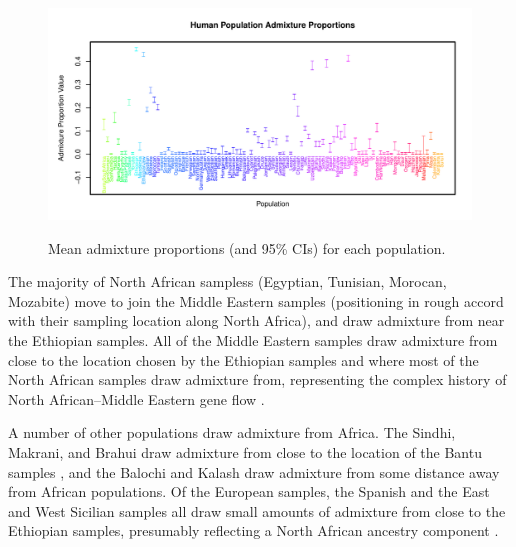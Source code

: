 \documentclass[12pt]{article}
\begin{document}
\begin{figure}
			{\includegraphics[width=\textwidth,height=0.45\textwidth]{figs/globetrotter/globe_adprop.pdf}}
	\caption{Mean admixture proportions (and 95\% CIs) for each population.
	\label{globe_ad_props}
    }
\end{figure}
The majority of North African sampless (Egyptian, Tunisian, Morocan, Mozabite) move to join the Middle Eastern samples (positioning in rough accord with their sampling location along North Africa), and draw admixture from near the Ethiopian samples. All of the Middle Eastern samples draw admixture from close to the location chosen by the Ethiopian samples and where most of the North African samples draw admixture from, representing the complex history of North African--Middle Eastern gene flow \citep{henn_genomic_2012,Hellenthal}. 

A number of other populations draw admixture from Africa. The Sindhi, Makrani, and Brahui draw admixture from close to the location of the Bantu samples \citep{Hellenthal}, and the Balochi and Kalash draw admixture from some distance away from African populations.  Of the European samples, the Spanish and the East and West Sicilian samples all draw small amounts of admixture from close to the Ethiopian samples, presumably reflecting a North African ancestry component \citep{moorjani_history_2011,botigue_gene_2013}. 
\end{document}
